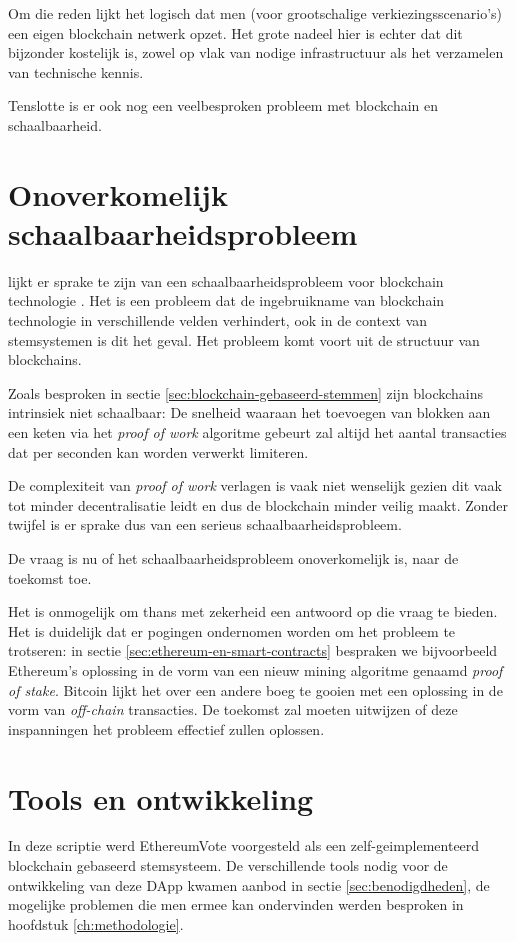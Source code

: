 Om die reden lijkt het logisch dat men (voor grootschalige verkiezingsscenario's) een eigen blockchain netwerk opzet. Het grote nadeel hier is echter dat dit bijzonder kostelijk is, zowel op vlak van nodige infrastructuur als het verzamelen van technische kennis.
	
Tenslotte is er ook nog een veelbesproken probleem met blockchain en schaalbaarheid.
\section{Onoverkomelijk schaalbaarheidsprobleem}
 lijkt er sprake te zijn van een schaalbaarheidsprobleem voor blockchain technologie . Het is een probleem dat de ingebruikname van blockchain technologie in verschillende velden verhindert, ook in de context van stemsystemen is dit het geval. Het probleem komt voort uit de structuur van blockchains. 
 
 Zoals besproken in sectie \ref{sec:blockchain-gebaseerd-stemmen} zijn blockchains intrinsiek niet schaalbaar: De snelheid waaraan het toevoegen van blokken aan een keten via het \textit{proof of work} algoritme gebeurt zal altijd het aantal transacties dat per seconden kan worden verwerkt limiteren. 
 
 De complexiteit van \textit{proof of work} verlagen is vaak niet wenselijk gezien dit vaak tot minder decentralisatie leidt en dus de blockchain minder veilig maakt. Zonder twijfel is er sprake dus van een serieus schaalbaarheidsprobleem.
	
De vraag is nu of het schaalbaarheidsprobleem onoverkomelijk is, naar de toekomst toe. 
	
Het is onmogelijk om thans met zekerheid een antwoord op die vraag te bieden. Het is duidelijk dat er pogingen ondernomen worden om het probleem te trotseren: in sectie \ref{sec:ethereum-en-smart-contracts} bespraken we bijvoorbeeld Ethereum's oplossing in de vorm van een nieuw mining algoritme genaamd \textit{proof of stake}. Bitcoin lijkt het over een andere boeg te gooien met een oplossing in de vorm van \textit{off-chain} transacties. De toekomst zal moeten uitwijzen of deze inspanningen het probleem effectief zullen oplossen.
\section{Tools en ontwikkeling}
	
In deze scriptie werd EthereumVote voorgesteld als een zelf-geimplementeerd blockchain gebaseerd stemsysteem. De verschillende tools nodig voor de ontwikkeling van deze DApp kwamen aanbod in sectie \ref{sec:benodigdheden}, de mogelijke problemen die men ermee kan ondervinden werden besproken in hoofdstuk \ref{ch:methodologie}.
	 

